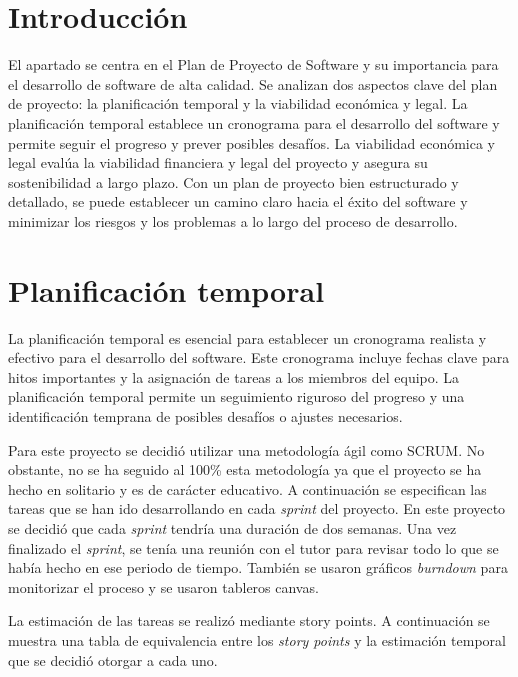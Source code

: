 
\section{Introducción}

El apartado se centra en el Plan de Proyecto de Software y su importancia para el desarrollo de software de alta calidad. Se analizan dos aspectos clave del plan de proyecto: la planificación temporal y la viabilidad económica y legal. La planificación temporal establece un cronograma para el desarrollo del software y permite seguir el progreso y prever posibles desafíos. La viabilidad económica y legal evalúa la viabilidad financiera y legal del proyecto y asegura su sostenibilidad a largo plazo. Con un plan de proyecto bien estructurado y detallado, se puede establecer un camino claro hacia el éxito del software y minimizar los riesgos y los problemas a lo largo del proceso de desarrollo. \cite{wiki:proyectosoftware}

\section{Planificación temporal}

La planificación temporal es esencial para establecer un cronograma realista y efectivo para el desarrollo del software. Este cronograma incluye fechas clave para hitos importantes y la asignación de tareas a los miembros del equipo. La planificación temporal permite un seguimiento riguroso del progreso y una identificación temprana de posibles desafíos o ajustes necesarios.

Para este proyecto se decidió utilizar una metodología ágil como SCRUM. No obstante, no se ha seguido al 100\% esta metodología ya que el proyecto se ha hecho en solitario y es de carácter educativo. A continuación se especifican las tareas que se han ido desarrollando en cada \textit{sprint} del proyecto. En este proyecto se decidió que cada \textit{sprint} tendría una duración de dos semanas. Una vez finalizado el \textit{sprint}, se tenía una reunión con el tutor para revisar todo lo que se había hecho en ese periodo de tiempo. También se usaron gráficos \textit{burndown} para monitorizar el proceso y se usaron tableros canvas.

La estimación de las tareas se realizó mediante story points. A continuación se muestra una tabla de equivalencia entre los \textit{story points} y la estimación temporal que se decidió otorgar a cada uno.

